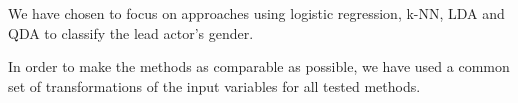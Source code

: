\documentclass[../../project.tex]{subfiles}
\begin{document}
	We have chosen to focus on approaches using logistic regression, k-NN, LDA and QDA to classify the lead actor's gender.
	
	In order to make the methods as comparable as possible, we have used a common set of transformations of the input variables for all tested methods.
\end{document}
